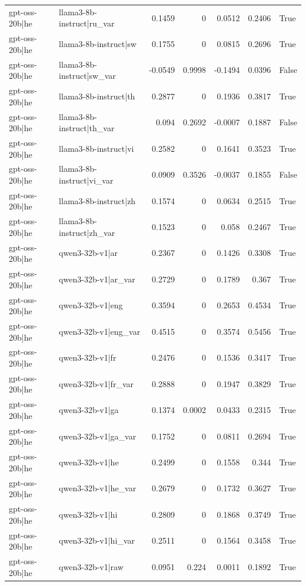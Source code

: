 \begin{table}
\begin{tabular}{l l r r r r l}
gpt-oss-20b|he & llama3-8b-instruct|ru_var & 0.1459 & 0 & 0.0512 & 0.2406 & True \\
gpt-oss-20b|he & llama3-8b-instruct|sw & 0.1755 & 0 & 0.0815 & 0.2696 & True \\
gpt-oss-20b|he & llama3-8b-instruct|sw_var & -0.0549 & 0.9998 & -0.1494 & 0.0396 & False \\
gpt-oss-20b|he & llama3-8b-instruct|th & 0.2877 & 0 & 0.1936 & 0.3817 & True \\
gpt-oss-20b|he & llama3-8b-instruct|th_var & 0.094 & 0.2692 & -0.0007 & 0.1887 & False \\
gpt-oss-20b|he & llama3-8b-instruct|vi & 0.2582 & 0 & 0.1641 & 0.3523 & True \\
gpt-oss-20b|he & llama3-8b-instruct|vi_var & 0.0909 & 0.3526 & -0.0037 & 0.1855 & False \\
gpt-oss-20b|he & llama3-8b-instruct|zh & 0.1574 & 0 & 0.0634 & 0.2515 & True \\
gpt-oss-20b|he & llama3-8b-instruct|zh_var & 0.1523 & 0 & 0.058 & 0.2467 & True \\
gpt-oss-20b|he & qwen3-32b-v1|ar & 0.2367 & 0 & 0.1426 & 0.3308 & True \\
gpt-oss-20b|he & qwen3-32b-v1|ar_var & 0.2729 & 0 & 0.1789 & 0.367 & True \\
gpt-oss-20b|he & qwen3-32b-v1|eng & 0.3594 & 0 & 0.2653 & 0.4534 & True \\
gpt-oss-20b|he & qwen3-32b-v1|eng_var & 0.4515 & 0 & 0.3574 & 0.5456 & True \\
gpt-oss-20b|he & qwen3-32b-v1|fr & 0.2476 & 0 & 0.1536 & 0.3417 & True \\
gpt-oss-20b|he & qwen3-32b-v1|fr_var & 0.2888 & 0 & 0.1947 & 0.3829 & True \\
gpt-oss-20b|he & qwen3-32b-v1|ga & 0.1374 & 0.0002 & 0.0433 & 0.2315 & True \\
gpt-oss-20b|he & qwen3-32b-v1|ga_var & 0.1752 & 0 & 0.0811 & 0.2694 & True \\
gpt-oss-20b|he & qwen3-32b-v1|he & 0.2499 & 0 & 0.1558 & 0.344 & True \\
gpt-oss-20b|he & qwen3-32b-v1|he_var & 0.2679 & 0 & 0.1732 & 0.3627 & True \\
gpt-oss-20b|he & qwen3-32b-v1|hi & 0.2809 & 0 & 0.1868 & 0.3749 & True \\
gpt-oss-20b|he & qwen3-32b-v1|hi_var & 0.2511 & 0 & 0.1564 & 0.3458 & True \\
gpt-oss-20b|he & qwen3-32b-v1|raw & 0.0951 & 0.224 & 0.0011 & 0.1892 & True \\

\end{tabular}
\end{table}
